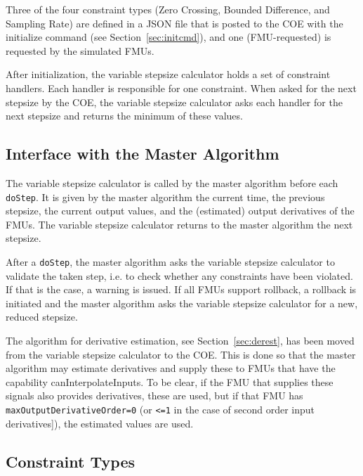 %
%
%
%
%




Three of the four constraint types (Zero Crossing, Bounded Difference, and Sampling Rate) are defined in a JSON file that is posted to the COE with the initialize command (see Section~\ref{sec:initcmd}), and one (FMU-requested) is requested by the simulated FMUs.

\noindent After initialization, the variable stepsize calculator holds a set of constraint handlers. Each handler is responsible for one constraint. When asked for the next stepsize by the COE, the variable stepsize calculator asks each handler for the next stepsize and returns the minimum of these values.

\subsection{Interface with the Master Algorithm}

The variable stepsize calculator is called by the master algorithm before each \texttt{doStep}. It is given by the master algorithm the current time, the previous stepsize, the current output values, and the (estimated) output derivatives of the FMUs. The variable stepsize calculator returns to the master algorithm the next stepsize.

After a \texttt{doStep}, the master algorithm asks the variable stepsize calculator to validate the taken step, i.e. to check whether any constraints have been violated. If that is the case, a warning is issued. If all FMUs support rollback, a rollback is initiated and the master algorithm asks the variable stepsize calculator for a new, reduced stepsize.

The algorithm for derivative estimation, see Section~\ref{sec:derest}, has been moved from the variable stepsize calculator to the COE. This is done so that the master algorithm may estimate derivatives and supply these to FMUs that have the capability canInterpolateInputs. To be clear, if the FMU that supplies these signals also provides derivatives, these are used, but if that FMU has \texttt{maxOutputDerivativeOrder=0} (or \texttt{<=1} in the case of second order input derivatives]), the estimated values are used.

\subsection{Constraint Types}

